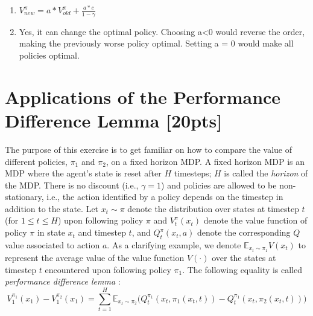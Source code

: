 \documentclass[11pt]{article}
\newcommand{\E}{\mathbb E}
\begin{document}
\begin{tcolorbox}[breakable]
\begin{enumerate}[label=(\alph*)]
    
    \item $V^{\pi}_{new} = a* V^{\pi}_{old} + \frac{a*c}{1-\gamma}$
    
    \item Yes, it can change the optimal policy. Choosing a<0 would reverse the order, making the previously worse policy optimal. Setting a = 0 would make all policies optimal. 
\end{enumerate}

\end{tcolorbox}

\newpage

\section{Applications of the Performance Difference Lemma [20pts]}

The purpose of this exercise is to get familiar on how to compare the value of different policies, $\pi_1$ and $\pi_2$, on a fixed horizon MDP. A fixed horizon MDP is an MDP where the agent's state is reset after $H$ timesteps; $H$ is called the \emph{horizon} of the MDP. There is no discount (i.e., $\gamma=1$) and policies are allowed to be non-stationary, i.e., the action identified by a policy depends on the timestep in addition to the state.
Let $x_t\sim \pi$ denote the distribution over states at timestep $t$ (for $1\leq t \leq H$) upon following policy $\pi$ and $V^{\pi}_t(x_t)$ denote the value function of policy $\pi$ in state 
$x_t$ and timestep $t$, and $Q_t^{\pi}(x_t,a)$ denote the corresponding 
$Q$ value associated to action $a$. As a clarifying example, we denote $\E_{x_t \sim \pi_1} V(x_t)$ to represent the average value of the value function $V(\cdot)$ over the states at timestep $t$ encountered upon following policy $\pi_1$. The following equality is called \emph{performance difference lemma} :
\begin{equation}
\label{eq:1}
V_1^{\pi_1}(x_1) - V_1^{\pi_2}(x_1) =  \sum_{t=1}^H \E_{x_t \sim \pi_2} \Big( Q_t^{\pi_1}(x_t,\pi_1(x_t,t)) - Q_t^{\pi_1}(x_t,\pi_2(x_t,t)) \Big)
\end{equation}
\end{document}
